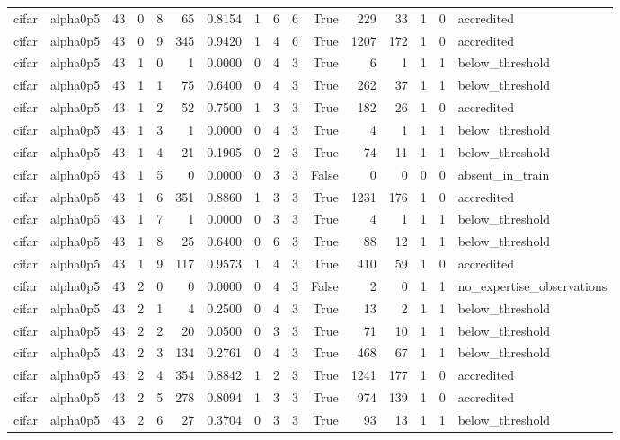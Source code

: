 \begin{tabular}{llrrrrrrrrrrrrrl}
cifar & alpha0p5 & 43 & 0 & 8 & 65 & 0.8154 & 1 & 6 & 6 & True & 229 & 33 & 1 & 0 & accredited \\
cifar & alpha0p5 & 43 & 0 & 9 & 345 & 0.9420 & 1 & 4 & 6 & True & 1207 & 172 & 1 & 0 & accredited \\
cifar & alpha0p5 & 43 & 1 & 0 & 1 & 0.0000 & 0 & 4 & 3 & True & 6 & 1 & 1 & 1 & below\_threshold \\
cifar & alpha0p5 & 43 & 1 & 1 & 75 & 0.6400 & 0 & 4 & 3 & True & 262 & 37 & 1 & 1 & below\_threshold \\
cifar & alpha0p5 & 43 & 1 & 2 & 52 & 0.7500 & 1 & 3 & 3 & True & 182 & 26 & 1 & 0 & accredited \\
cifar & alpha0p5 & 43 & 1 & 3 & 1 & 0.0000 & 0 & 4 & 3 & True & 4 & 1 & 1 & 1 & below\_threshold \\
cifar & alpha0p5 & 43 & 1 & 4 & 21 & 0.1905 & 0 & 2 & 3 & True & 74 & 11 & 1 & 1 & below\_threshold \\
cifar & alpha0p5 & 43 & 1 & 5 & 0 & 0.0000 & 0 & 3 & 3 & False & 0 & 0 & 0 & 0 & absent\_in\_train \\
cifar & alpha0p5 & 43 & 1 & 6 & 351 & 0.8860 & 1 & 3 & 3 & True & 1231 & 176 & 1 & 0 & accredited \\
cifar & alpha0p5 & 43 & 1 & 7 & 1 & 0.0000 & 0 & 3 & 3 & True & 4 & 1 & 1 & 1 & below\_threshold \\
cifar & alpha0p5 & 43 & 1 & 8 & 25 & 0.6400 & 0 & 6 & 3 & True & 88 & 12 & 1 & 1 & below\_threshold \\
cifar & alpha0p5 & 43 & 1 & 9 & 117 & 0.9573 & 1 & 4 & 3 & True & 410 & 59 & 1 & 0 & accredited \\
cifar & alpha0p5 & 43 & 2 & 0 & 0 & 0.0000 & 0 & 4 & 3 & False & 2 & 0 & 1 & 1 & no\_expertise\_observations \\
cifar & alpha0p5 & 43 & 2 & 1 & 4 & 0.2500 & 0 & 4 & 3 & True & 13 & 2 & 1 & 1 & below\_threshold \\
cifar & alpha0p5 & 43 & 2 & 2 & 20 & 0.0500 & 0 & 3 & 3 & True & 71 & 10 & 1 & 1 & below\_threshold \\
cifar & alpha0p5 & 43 & 2 & 3 & 134 & 0.2761 & 0 & 4 & 3 & True & 468 & 67 & 1 & 1 & below\_threshold \\
cifar & alpha0p5 & 43 & 2 & 4 & 354 & 0.8842 & 1 & 2 & 3 & True & 1241 & 177 & 1 & 0 & accredited \\
cifar & alpha0p5 & 43 & 2 & 5 & 278 & 0.8094 & 1 & 3 & 3 & True & 974 & 139 & 1 & 0 & accredited \\
cifar & alpha0p5 & 43 & 2 & 6 & 27 & 0.3704 & 0 & 3 & 3 & True & 93 & 13 & 1 & 1 & below\_threshold \\

\end{tabular}

